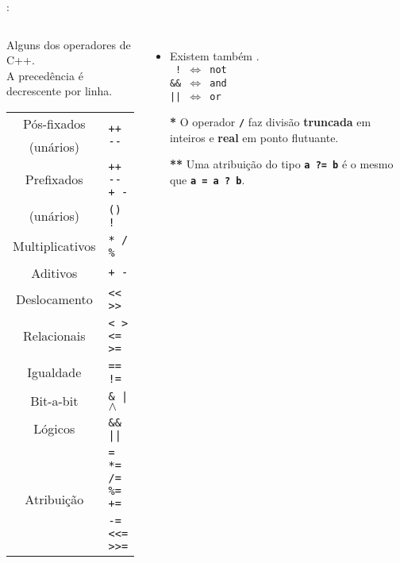 \begin{frame}{\insertsection: \insertsubsection}
	\begin{columns}[b]
		\begin{block}{\centering Alguns dos operadores de C++.\\{\small A precedência é decrescente por linha.}}
			\begin{tabular}{cl}
				Pós-fixados  & \multirow{2}{*}{\texttt{++ {-}{-}}}        \\
				(unários)    &                                            \\ \hline
				Prefixados   & \texttt{++ {-}{-} + -}                     \\
				(unários)    & \texttt{(\textbf{\HighlightType{tipo}}) !} \\ \hline
				Multiplicativos\HighlightSpecial{*} & \texttt{* / \%}     \\ \hline
				Aditivos     & \texttt{+ -}                               \\ \hline
				Deslocamento & \texttt{{<}{<} {>}{>}}                     \\ \hline
				Relacionais  & \texttt{< > <= >=}                         \\ \hline
				Igualdade    & \texttt{== !=}                             \\ \hline
				Bit-a-bit    & \texttt{\& | $\wedge$}                     \\ \hline
				Lógicos      & \texttt{\&\& ||}                           \\ \hline
				\multirow{2}{*}{Atribuição\HighlightSpecial{**}} & \texttt{= *= /= \%= +=} \\
										 & \texttt{-= <{<}= >{>}=}                    \\ %
			\end{tabular}
		\end{block}

		\begin{itemize}
		\item Existem também .\\
		\texttt{~!~$\Longleftrightarrow$~not}\\
		\texttt{\&\&~$\Longleftrightarrow$~and}\\
		\texttt{||~$\Longleftrightarrow$~or}\smallskip\\
		\item[\textbf{*}] O operador \textbf{\texttt{/}} faz divisão \textbf{truncada} em inteiros e \textbf{real} em ponto flutuante.
		\item[\textbf{**}] Uma atribuição do tipo \textbf{\texttt{a~?=~b}} é o mesmo que \textbf{\texttt{a~=~a~?~b}}.
		\end{itemize}
	\end{columns}
\end{frame}


